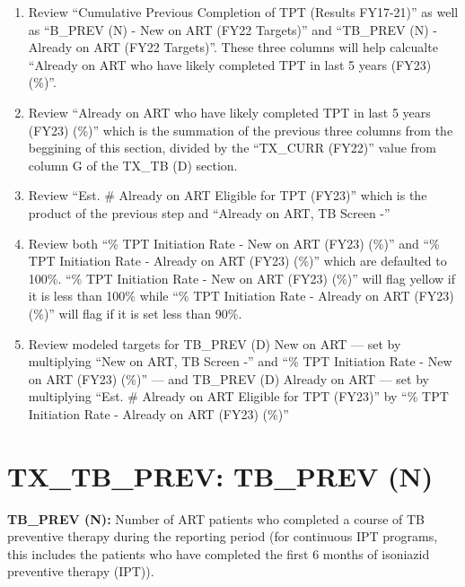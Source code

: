 \documentclass[
  openany]{book}
\begin{document}
\begin{enumerate}
\def\labelenumi{\arabic{enumi}.}
\item
  Review ``Cumulative Previous Completion of TPT (Results FY17-21)'' as
  well as ``B\_PREV (N) - New on ART (FY22 Targets)'' and ``TB\_PREV (N) -
  Already on ART (FY22 Targets)''. These three columns will help
  calcualte ``Already on ART who have likely completed TPT in last 5
  years (FY23) (\%)''.
\item
  Review ``Already on ART who have likely completed TPT in last 5 years
  (FY23) (\%)'' which is the summation of the previous three columns
  from the beggining of this section, divided by the ``TX\_CURR (FY22)''
  value from column G of the TX\_TB (D) section.
\item
  Review ``Est. \# Already on ART Eligible for TPT (FY23)'' which is the
  product of the previous step and ``Already on ART, TB Screen -''
\item
  Review both ``\% TPT Initiation Rate - New on ART (FY23) (\%)'' and ``\%
  TPT Initiation Rate - Already on ART (FY23) (\%)'' which are defaulted
  to 100\%. ``\% TPT Initiation Rate - New on ART (FY23) (\%)'' will flag
  yellow if it is less than 100\% while ``\% TPT Initiation Rate -
  Already on ART (FY23) (\%)'' will flag if it is set less than 90\%.
\item
  Review modeled targets for TB\_PREV (D) New on ART --- set by
  multiplying ``New on ART, TB Screen -'' and ``\% TPT Initiation Rate -
  New on ART (FY23) (\%)'' --- and TB\_PREV (D) Already on ART --- set by
  multiplying ``Est. \# Already on ART Eligible for TPT (FY23)'' by ``\%
  TPT Initiation Rate - Already on ART (FY23) (\%)''
\end{enumerate}

\hypertarget{tx_tb_prev-tb_prev-n}{%
\section{TX\_TB\_PREV: TB\_PREV (N)}\label{tx_tb_prev-tb_prev-n}}

\textbf{TB\_PREV (N):} Number of ART patients who completed a course of TB
preventive therapy during the reporting period (for continuous IPT
programs, this includes the patients who have completed the first 6
months of isoniazid preventive therapy (IPT)).
\end{document}
